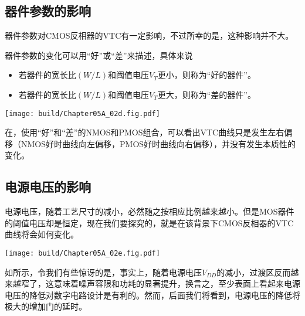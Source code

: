 \subsection{器件参数的影响}
器件参数对CMOS反相器的VTC有一定影响，不过所幸的是，这种影响并不大。

器件参数的变化可以用“好”或“差”来描述，具体来说
\begin{itemize}
    \item 若器件的宽长比$(W/L)$和阈值电压$V_{T}$更小，则称为“好的器件”。
    \item 若器件的宽长比$(W/L)$和阈值电压$V_{T}$更大，则称为“差的器件”。
\end{itemize}
\begin{Figure}[器件参数的影响]
    \texttt{[image: build/Chapter05A\_02d.fig.pdf]}\hspace{0.7cm}
\end{Figure}
在，使用“好”和“差”的NMOS和PMOS组合，可以看出VTC曲线只是发生左右偏移（NMOS好时曲线向左偏移，PMOS好时曲线向右偏移），并没有发生本质性的变化。

\subsection{电源电压的影响}
电源电压，随着工艺尺寸的减小，必然随之按相应比例越来越小。但是MOS器件的阈值电压却是恒定，现在我们要探究的，就是在该背景下CMOS反相器的VTC曲线将会如何变化。
\begin{Figure}[器件参数的影响]
    \texttt{[image: build/Chapter05A\_02e.fig.pdf]}\hspace{0.7cm}
\end{Figure}
如所示，令我们有些惊讶的是，事实上，随着电源电压$V_{DD}$的减小，过渡区反而越来越窄了，这意味着噪声容限和功耗的显著提升，换言之，至少表面上看起来电源电压的降低对数字电路设计是有利的。然而，后面我们将看到，电源电压的降低将极大的增加门的延时。
